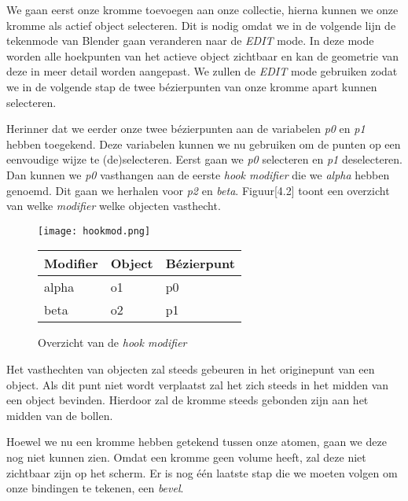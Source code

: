   

We gaan eerst onze kromme toevoegen aan onze collectie, hierna kunnen we onze kromme als actief object selecteren. Dit is nodig omdat we in de volgende lijn de tekenmode van Blender gaan veranderen naar de \textit{EDIT} mode. In deze mode worden alle hoekpunten van het actieve object zichtbaar en kan de geometrie van deze in meer detail worden aangepast. We zullen de \textit{EDIT} mode gebruiken zodat we in de volgende stap de twee bézierpunten van onze kromme apart kunnen selecteren. 



Herinner dat we eerder onze twee bézierpunten aan de variabelen \textit{p0} en \textit{p1} hebben toegekend. Deze variabelen kunnen we nu gebruiken om de punten op een eenvoudige wijze te (de)selecteren. Eerst gaan we \textit{p0} selecteren en \textit{p1} deselecteren. Dan kunnen we \textit{p0} vasthangen aan de eerste \textit{hook modifier} die we \textit{alpha} hebben genoemd. Dit gaan we herhalen voor \textit{p2} en \textit{beta}. Figuur[4.2] toont een overzicht van welke \textit{modifier} welke objecten vasthecht.  

\begin{figure}[h]
\texttt{[image: hookmod.png]}
\begin{tabular}{lll}
\hline
\multicolumn{1}{|l|}{Modifier} & \multicolumn{1}{l|}{Object} & \multicolumn{1}{l|}{Bézierpunt} \\ \hline
alpha                          & o1                          & p0                              \\
beta                           & o2                          & p1                             
\end{tabular}
\caption{Overzicht van de \textit{hook modifier}}
\end{figure}

Het vasthechten van objecten zal steeds gebeuren in het originepunt van een object. Als dit punt niet wordt verplaatst zal het zich steeds in het midden van een object bevinden. Hierdoor zal de kromme steeds gebonden zijn aan het midden van de bollen.
\par
Hoewel we nu een kromme hebben getekend tussen onze atomen, gaan we deze nog niet kunnen zien. Omdat een kromme geen volume heeft, zal deze niet zichtbaar zijn op het scherm. Er is nog één laatste stap die we moeten volgen om onze bindingen te tekenen, een \textit{bevel}.

